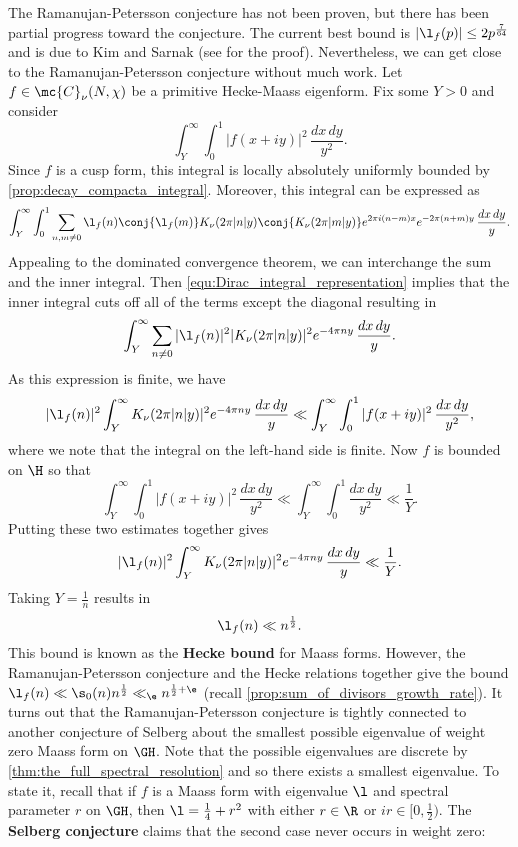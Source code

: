     The Ramanujan-Petersson conjecture has not been proven, but there has been partial progress toward the conjecture. The current best bound is $|\l_{f}(p)| \le 2p^{\frac{7}{64}}$ and is due to Kim and Sarnak (see \cite{kim2003functoriality} for the proof). Nevertheless, we can get close to the Ramanujan-Petersson conjecture without much work. Let $f \in \mc{C}_{\nu}(N,\chi)$ be a primitive Hecke-Maass eigenform. Fix some $Y > 0$ and consider
    \[
      \int_{Y}^{\infty}\int_{0}^{1}|f(x+iy)|^{2}\,\frac{dx\,dy}{y^{2}}.
    \]
    Since $f$ is a cusp form, this integral is locally absolutely uniformly bounded by \cref{prop:decay_compacta_integral}.
    Moreover, this integral can be expressed as
    \[
      \int_{Y}^{\infty}\int_{0}^{1}\sum_{n,m \neq 0}\l_{f}(n)\conj{\l_{f}(m)}K_{\nu}(2\pi|n|y)\conj{K_{\nu}(2\pi|m|y)}e^{2\pi i(n-m)x}e^{-2\pi(n+m)y}\,\frac{dx\,dy}{y}.
    \]
    Appealing to the dominated convergence theorem, we can interchange the sum and the inner integral. Then \cref{equ:Dirac_integral_representation} implies that the inner integral cuts off all of the terms except the diagonal resulting in
    \[
      \int_{Y}^{\infty}\sum_{n \neq 0}|\l_{f}(n)|^{2}|K_{\nu}(2\pi|n|y)|^{2}e^{-4\pi ny}\,\frac{dx\,dy}{y}.
    \]
    As this expression is finite, we have
    \[
      |\l_{f}(n)|^{2}\int_{Y}^{\infty}K_{\nu}(2\pi|n|y)|^{2}e^{-4\pi ny}\,\frac{dx\,dy}{y} \ll \int_{Y}^{\infty}\int_{0}^{1}|f(x+iy)|^{2}\,\frac{dx\,dy}{y^{2}},
    \]
    where we note that the integral on the left-hand side is finite. Now $f$ is bounded on $\H$ so that
    \[
      \int_{Y}^{\infty}\int_{0}^{1}|f(x+iy)|^{2}\,\frac{dx\,dy}{y^{2}} \ll \int_{Y}^{\infty}\int_{0}^{1}\frac{dx\,dy}{y^{2}} \ll \frac{1}{Y}.
    \]
    Putting these two estimates together gives
    \[
      |\l_{f}(n)|^{2}\int_{Y}^{\infty}K_{\nu}(2\pi|n|y)|^{2}e^{-4\pi ny}\,\frac{dx\,dy}{y} \ll \frac{1}{Y}.
    \]
    Taking $Y = \frac{1}{n}$ results in
    \[
      \l_{f}(n) \ll n^{\frac{1}{2}}.
    \]
    This bound is known as the \textbf{Hecke bound} for Maass forms. However, the Ramanujan-Petersson conjecture and the Hecke relations together give the bound $\l_{f}(n) \ll \s_{0}(n)n^{\frac{1}{2}} \ll_{\e} n^{\frac{1}{2}+\e}$ (recall \cref{prop:sum_of_divisors_growth_rate}). It turns out that the Ramanujan-Petersson conjecture is tightly connected to another conjecture of Selberg about the smallest possible eigenvalue of weight zero Maass form on $\GH$. Note that the possible eigenvalues are discrete by \cref{thm:the_full_spectral_resolution} and so there exists a smallest eigenvalue. To state it, recall that if $f$ is a Maass form with eigenvalue $\l$ and spectral parameter $r$ on $\GH$, then $\l = \frac{1}{4}+r^{2}$ with either $r \in \R$ or $ir \in [0,\frac{1}{2})$. The \textbf{Selberg conjecture} claims that the second case never occurs in weight zero:

